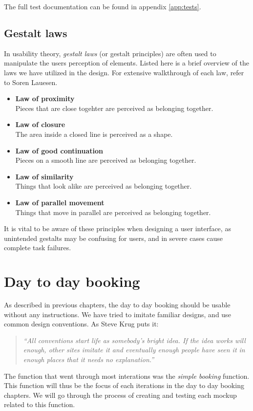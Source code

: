 The full test documentation can be found in appendix \ref{app:tests}.

\subsection{Gestalt laws}
In usability theory, \emph{gestalt laws} (or gestalt principles) are often used to manipulate the users perception of elements. Listed here is a brief overview of the laws we have utilized in the design. For extensive walkthrough of each law, refer to Soren Lauesen\cite{lauesen}. 
\begin{itemize}
\item \textbf{Law of proximity} \\
Pieces that are close togehter are perceived as belonging together.
\item \textbf{Law of closure} \\
The area inside a closed line is perceived as a shape.
\item \textbf{Law of good continuation} \\
Pieces on a smooth line are perceived as belonging together.
\item \textbf{Law of similarity} \\
Things that look alike are perceived as belonging together.
\item \textbf{Law of parallel movement} \\
Things that move in parallel are perceived as belonging together.
\end{itemize}

It is vital to be aware of these principles when designing a user interface, as unintended gestalts may be confusing for users, and in severe cases cause complete task failures.\cite{lauesen}

\section{Day to day booking}
\label{sec:day_to_day_booking_ui}
As described in previous chapters, the day to day booking should be usable without any instructions. We have tried to imitate familiar designs, and use common design conventions. As Steve Krug puts it\cite{steve}: 
\begin{quotation}
\emph{``All conventions start life as somebody's bright idea. If the idea works will enough, other sites imitate it and eventually enough people have seen it in enough places that it needs no explanation.''}
\end{quotation}
The function that went through most interations was the \emph{simple booking} function. This function will thus be the focus of each iterations in the day to day booking chapters. We will go through the process of creating and testing each mockup related to this function.\\
